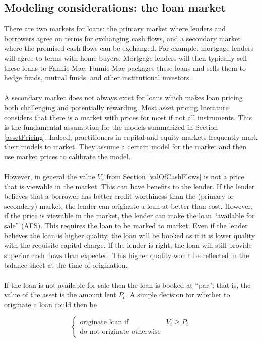 \documentclass{article}
\theoremstyle{definition}
\begin{document}
\subsection{Modeling considerations: the loan market}
\label{loanMarket}
There are two markets for loans: the primary market where lenders and borrowers agree on terms for exchanging cash flows, and a secondary market where the promised cash flows can be exchanged.  For example, mortgage lenders will agree to terms with home buyers.  Mortgage lenders will then typically sell these loans to Fannie Mae.  Fannie Mae packages these loans and sells them to hedge funds, mutual funds, and other institutional investors.  
\\
\\
A secondary market does not always exist for loans which makes loan pricing both challenging and potentially rewarding. Most asset pricing literature considers that there is a market with prices for most if not all instruments.  This is the fundamental assumption for the models summarized in Section \ref{assetPricing}.  Indeed, practitioners in capital and equity markets frequently mark their models to market.  They assume a certain model for the market and then use market prices to calibrate the model.  
\\
\\
However, in general the value \(V_s\) from Section \ref{valOfCashFlows} is not a price that is viewable in the market.  This can have benefits to the lender.  If the lender believes that a borrower has better credit worthiness than the (primary or secondary) market, the lender can originate a loan at better than cost.  However, if the price is viewable in the market, the lender can make the loan ``available for sale'' (AFS).  This requires the loan to be marked to market.  Even if the lender believes the loan is higher quality, the loan will be booked as if it is lower quality with the requisite capital charge.  If the lender is right, the loan will still provide superior cash flows than expected.  This higher quality won't be reflected in the balance sheet at the time of origination. 
\\
\\
If the loan is not available for sale then the loan is booked at ``par''; that is, the value of the asset is the amount lent \(P_t\).  A simple decision for whether to originate a loan could then be 

\begin{equation}
\left\{
\begin{array}{ll}
\text{originate loan if} & V_t \geq P_t\\
\text{do not originate otherwise} 
\end{array} \right.
\end{equation}
\end{document}
